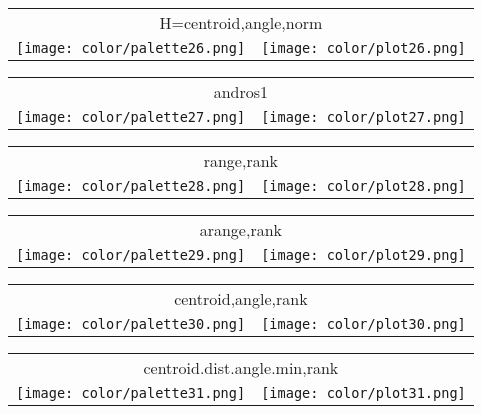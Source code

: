 \documentclass{article}
\begin{document}
\begin{center}
\begin{tabular}{m{8cm}m{8cm}}
\multicolumn{2}{c}{H=centroid,angle,norm} \\
\texttt{[image: color/palette26.png]} &
\texttt{[image: color/plot26.png]}
\end{tabular}
\end{center}

\begin{center}
\begin{tabular}{m{8cm}m{8cm}}
\multicolumn{2}{c}{andros1} \\
\texttt{[image: color/palette27.png]} &
\texttt{[image: color/plot27.png]}
\end{tabular}
\end{center}

\begin{center}
\begin{tabular}{m{8cm}m{8cm}}
\multicolumn{2}{c}{range,rank} \\
\texttt{[image: color/palette28.png]} &
\texttt{[image: color/plot28.png]}
\end{tabular}
\end{center}

\begin{center}
\begin{tabular}{m{8cm}m{8cm}}
\multicolumn{2}{c}{arange,rank} \\
\texttt{[image: color/palette29.png]} &
\texttt{[image: color/plot29.png]}
\end{tabular}
\end{center}

\begin{center}
\begin{tabular}{m{8cm}m{8cm}}
\multicolumn{2}{c}{centroid,angle,rank} \\
\texttt{[image: color/palette30.png]} &
\texttt{[image: color/plot30.png]}
\end{tabular}
\end{center}

\begin{center}
\begin{tabular}{m{8cm}m{8cm}}
\multicolumn{2}{c}{centroid.dist.angle.min,rank} \\
\texttt{[image: color/palette31.png]} &
\texttt{[image: color/plot31.png]}
\end{tabular}
\end{center}
\end{document}

